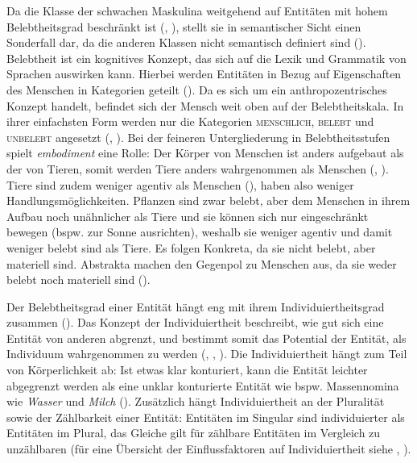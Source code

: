 Da die Klasse der schwachen Maskulina weitgehend auf Entitäten mit hohem Belebtheitsgrad beschränkt ist (\cite[74]{Bittner.20031991}, \cite[169--170]{Kopcke.1995}), stellt sie in semantischer Sicht einen Sonderfall dar, da die anderen Klassen nicht semantisch definiert sind (\cite[154--155]{Nubling.2016}). Belebtheit ist ein kognitives Konzept, das sich auf die Lexik und Grammatik von Sprachen auswirken kann. Hierbei werden Entitäten in Bezug auf Eigenschaften des Menschen in Kategorien geteilt (\cite[208]{Enger.2011}). Da es sich um ein anthropozentrisches Konzept handelt, befindet sich der Mensch weit oben auf der Belebtheitskala. In ihrer einfachsten Form werden nur die Kategorien \textsc{menschlich}, \textsc{belebt} und \textsc{unbelebt} angesetzt (\cite[122--123]{Silverstein.1976}, \cite[185]{Comrie.1989}).  Bei der feineren Untergliederung in Belebtheitsstufen spielt \textit{embodiment} eine Rolle: Der Körper von Menschen ist anders aufgebaut als der von Tieren, somit werden Tiere anders wahrgenommen als Menschen (\cite[208]{Enger.2011}, \cite[94--96]{Flick.2020}). Tiere sind zudem weniger agentiv als Menschen (\cite[344--345]{Szczepaniak.2011}), haben also weniger Handlungsmöglichkeiten. Pflanzen sind zwar belebt, aber dem Menschen in ihrem Aufbau noch unähnlicher als Tiere und sie können sich nur eingeschränkt bewegen (bspw. zur Sonne ausrichten), weshalb sie weniger agentiv und damit weniger belebt sind als Tiere. Es folgen Konkreta, da sie nicht belebt, aber materiell sind. Abstrakta machen den Gegenpol zu Menschen aus, da sie weder belebt noch materiell sind (\cite[344--345]{Szczepaniak.2011}).

 

Der Belebtheitsgrad einer Entität hängt eng mit ihrem Individuiertheitsgrad zusammen (\cite[104]{Flick.2020}). Das Konzept der Individuiertheit beschreibt, wie gut sich eine Entität von anderen abgrenzt, und bestimmt somit das Potential der Entität, als Individuum wahrgenommen zu werden (\cite[253]{Hopper.1980}, \cite[344--346]{Szczepaniak.2011}, \cite[103]{Flick.2020}). Die Individuiertheit hängt zum Teil von Körperlichkeit ab: Ist etwas klar konturiert, kann die Entität leichter abgegrenzt werden als eine unklar konturierte Entität wie bspw. Massennomina wie \textit{Wasser} und \textit{Milch} (\cite[345]{Szczepaniak.2011}). Zusätzlich hängt Individuiertheit an der Pluralität sowie der Zählbarkeit einer Entität: Entitäten im Singular sind individuierter als Entitäten im Plural, das Gleiche gilt für zählbare Entitäten im Vergleich zu unzählbaren (für eine Übersicht der Einflussfaktoren auf Individuiertheit siehe \cite[253]{Hopper.1980}, \cite[104]{Flick.2020}). 


